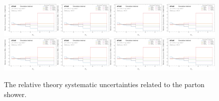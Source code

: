 \begin{figure}[h!]
\includegraphics[width=0.25\textwidth,page=17]{figures/SimResults/MultiFold_Theory_SystEffect.pdf}\includegraphics[width=0.25\textwidth,page=18]{figures/SimResults/MultiFold_Theory_SystEffect.pdf}\includegraphics[width=0.25\textwidth,page=19]{figures/SimResults/MultiFold_Theory_SystEffect.pdf}\includegraphics[width=0.25\textwidth,page=20]{figures/SimResults/MultiFold_Theory_SystEffect.pdf}\\
\includegraphics[width=0.25\textwidth,page=21]{figures/SimResults/MultiFold_Theory_SystEffect.pdf}\includegraphics[width=0.25\textwidth,page=22]{figures/SimResults/MultiFold_Theory_SystEffect.pdf}\includegraphics[width=0.25\textwidth,page=23]{figures/SimResults/MultiFold_Theory_SystEffect.pdf}\includegraphics[width=0.25\textwidth,page=24]{figures/SimResults/MultiFold_Theory_SystEffect.pdf}
\caption{The relative theory systematic uncertainties related to the parton shower.}
\label{fig:simresultsmulti_theoryuncertsl}
\end{figure}

